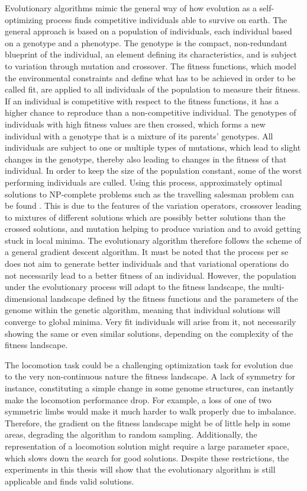 \documentclass[main]{subfiles}
\begin{document}
Evolutionary algorithms mimic the general way of how evolution as a self-optimizing process finds competitive individuals able to survive on earth. %
%
The general approach is based on a population of individuals, each individual based on a genotype and a phenotype. %
%
The genotype is the compact, non-redundant blueprint of the individual, an element defining its characteristics, and is subject to variation through mutation and crossover. %
%
The fitness functions, which model the environmental constraints and define what has to be achieved in order to be called fit, are applied to all individuals of the population to measure their fitness. %
%
If an individual is competitive with respect to the fitness functions, it has a higher chance to reproduce than a non-competitive individual. %
%
The genotypes of individuals with high fitness values are then crossed, which forms a new individual with a genotype that is a mixture of its parents' genotypes. %
%
All individuals are subject to one or multiple types of mutations, which lead to slight changes in the genotype, thereby also leading to changes in the fitness of that individual. %
%
In order to keep the size of the population constant, some of the worst performing individuals are culled. %
%
Using this process, approximately optimal solutions to NP-complete problems such as the travelling salesman problem can be found \cite{bib:Potvin1996}. %
%
This is due to the features of the variation operators, crossover leading to mixtures of different solutions which are possibly better solutions than the crossed solutions, and mutation helping to produce variation and to avoid getting stuck in local minima. %
%
The evolutionary algorithm therefore follows the scheme of a general gradient descent algorithm. %
%
It must be noted that the process per se does not aim to generate better individuals and that variational operations do not necessarily lead to a better fitness of an individual. %
%
However, the population under the evolutionary process will adapt to the fitness landscape, the multi-dimensional landscape defined by the fitness functions and the parameters of the genome within the genetic algorithm, meaning that individual solutions will converge to global minima. %
%
Very fit individuals will arise from it, not necessarily showing the same or even similar solutions, depending on the complexity of the fitness landscape. 


The locomotion task could be a challenging optimization task for evolution due to the very non-continuous nature the fitness landscape. %
%
A lack of symmetry for instance, constituting a simple change in some genome structures, can instantly make the locomotion performance drop. %
For example, a loss of one of two symmetric limbs would make it much harder to walk properly due to imbalance. %
%
Therefore, the gradient on the fitness landscape might be of little help in some areas, degrading the algorithm to random sampling. %
%
Additionally, the representation of a locomotion solution might require a large parameter space, which slows down the search for good solutions. %
%
Despite these restrictions, the experiments in this thesis will show that the evolutionary algorithm is still applicable and finds valid solutions.
\end{document}
